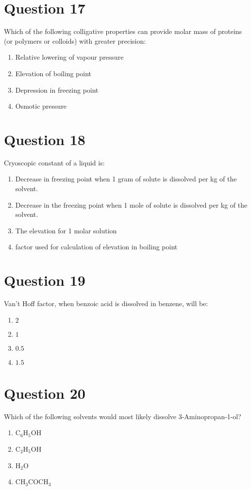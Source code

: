 \documentclass{article}
\begin{document}
\section*{Question 17}
Which of the following colligative properties can provide molar mass of proteins (or polymers or colloids) with greater precision:
\begin{enumerate}[label=(\alph*)]
\item Relative lowering of vapour pressure
\item Elevation of boiling point
\item Depression in freezing point
\item Osmotic pressure
\end{enumerate}
\newpage
\section*{Question 18}
Cryoscopic constant of a liquid is:
\begin{enumerate}[label=(\alph*)]
\item Decrease in freezing point when 1 gram of solute is dissolved per kg of the solvent.
\item Decrease in the freezing point when 1 mole of solute is dissolved per kg of the solvent.
\item The elevation for 1 molar solution
\item factor used for calculation of elevation in boiling point
\end{enumerate}
\newpage
\section*{Question 19}
Van't Hoff factor, when benzoic acid is dissolved in benzene, will be:
\begin{enumerate}[label=(\alph*)]
\item \(2\)
\item \(1\)
\item \(0.5\)
\item \(1.5\)
\end{enumerate}
\newpage
\section*{Question 20}
Which of the following solvents would most likely dissolve 3-Aminopropan-1-ol?
\begin{enumerate}[label=(\alph*)]
\item C$_{6}$H$_{5}$OH
\item C$_{2}$H$_{5}$OH
\item H$_{2}$O
\item CH$_{3}$COCH$_{3}$
\end{enumerate}
\newpage
\end{document}
